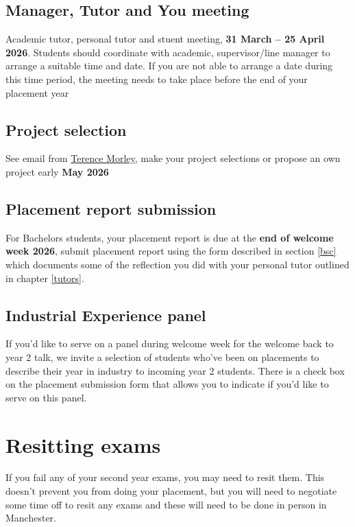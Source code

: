 \documentclass[
]{book}
\begin{document}
\subsection{Manager, Tutor and You meeting}\label{three}

Academic tutor, personal tutor and stuent meeting, \textbf{31 March -- 25 April 2026}. Students should coordinate with academic, supervisor/line manager to arrange a suitable time and date. If you are not able to arrange a date during this time period, the meeting needs to take place before the end of your placement year

\subsection{Project selection}\label{four}

See email from \href{https://research.manchester.ac.uk/en/persons/terence.morley}{Terence Morley}, make your project selections or propose an own project early \textbf{May 2026}

\subsection{Placement report submission}\label{five}

For Bachelors students, your placement report is due at the \textbf{end of welcome week 2026}, submit placement report using the form described in section \ref{bsc} which documents some of the reflection you did with your personal tutor outlined in chapter \ref{tutors}.

\subsection{Industrial Experience panel}\label{six}

If you'd like to serve on a panel during welcome week for the welcome back to year 2 talk, we invite a selection of students who've been on placements to describe their year in industry to incoming year 2 students. There is a check box on the placement submission form that allows you to indicate if you'd like to serve on this panel.

\section{Resitting exams}\label{resits}

If you fail any of your second year exams, you may need to resit them. This doesn't prevent you from doing your placement, but you will need to negotiate some time off to resit any exams and these will need to be done in person in Manchester. \citep{resits}
\end{document}
